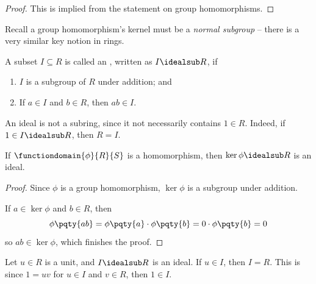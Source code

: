 \begin{proof}
    This is implied from the statement on group homomorphisms.
\end{proof}

Recall a group homomorphism's kernel must be a \emph{normal subgroup} -- there is a very similar key notion in rings.

\begin{definition}[Ideal]
    \label{def:ideal}%
    A subset \(I \subseteq R\) is called an , written as \(I \idealsub R\), if
    \begin{enumerate}
        \item \(I\) is a subgroup of \(R\) under addition; and
        \item {} If \(a \in I\) and \(b \in R\), then \(ab \in I\).
    \end{enumerate}
\end{definition}

\begin{remark}
    An ideal is not a subring, since it not necessarily contains \(1 \in R\). Indeed, if \(1 \in I \idealsub R\), then \(R = I\).
\end{remark}

\begin{lemma}
    \label{lem:kernel-are-ideal}%
    If \(\functiondomain{\phi}{R}{S}\) is a homomorphism, then \(\ker \phi \idealsub R\) is an ideal.
\end{lemma}

\begin{proof}
    Since \(\phi\) is a group homomorphism, \(\ker \phi\) is a subgroup under addition.

    If \(a \in \ker \phi\) and \(b \in R\), then
    \[
        \phi\pqty{ab} = \phi\pqty{a} \cdot \phi\pqty{b} = 0 \cdot \phi\pqty{b} = 0
    \]
    so \(ab \in \ker \phi\), which finishes the proof.
\end{proof}

\begin{remark}
    Let \(u \in R\) is a unit, and \(I \idealsub R\) is an ideal. If \(u \in I\), then \(I = R\). This is since \(1 = u v\) for \(u \in I\) and \(v \in R\), then \(1 \in I\).
\end{remark}

